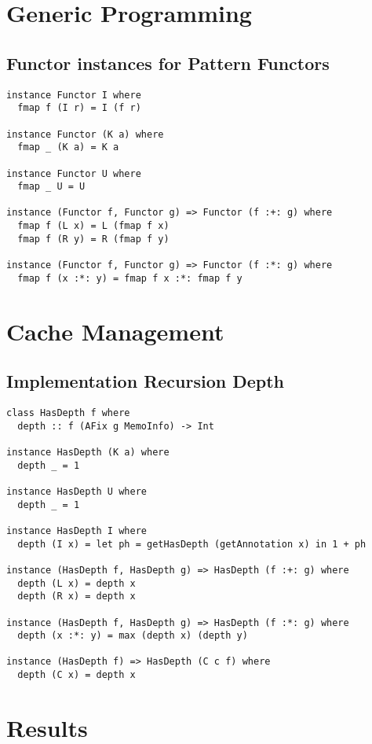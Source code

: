 \appendix
{}
\chapter{Generic Programming}
\section{Functor instances for Pattern Functors}
\label{app-inst-functor-patfun}
\begin{verbatim}
instance Functor I where
  fmap f (I r) = I (f r)

instance Functor (K a) where
  fmap _ (K a) = K a

instance Functor U where
  fmap _ U = U

instance (Functor f, Functor g) => Functor (f :+: g) where
  fmap f (L x) = L (fmap f x)
  fmap f (R y) = R (fmap f y)

instance (Functor f, Functor g) => Functor (f :*: g) where
  fmap f (x :*: y) = fmap f x :*: fmap f y
\end{verbatim}

\chapter{Cache Management}
\section{Implementation Recursion Depth}
\label{app-sec-impl-rec-depth}
\begin{verbatim}
class HasDepth f where
  depth :: f (AFix g MemoInfo) -> Int

instance HasDepth (K a) where
  depth _ = 1

instance HasDepth U where
  depth _ = 1

instance HasDepth I where
  depth (I x) = let ph = getHasDepth (getAnnotation x) in 1 + ph

instance (HasDepth f, HasDepth g) => HasDepth (f :+: g) where
  depth (L x) = depth x
  depth (R x) = depth x

instance (HasDepth f, HasDepth g) => HasDepth (f :*: g) where
  depth (x :*: y) = max (depth x) (depth y)

instance (HasDepth f) => HasDepth (C c f) where
  depth (C x) = depth x
\end{verbatim}

\chapter{Results}

